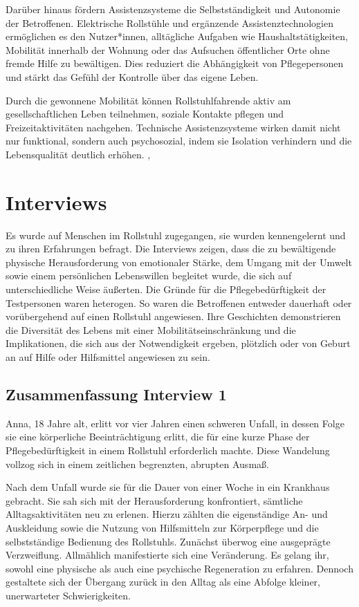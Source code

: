 Darüber hinaus fördern Assistenzsysteme die Selbstständigkeit und Autonomie der Betroffenen. Elektrische Rollstühle und ergänzende Assistenztechnologien ermöglichen es den Nutzer*innen, alltägliche Aufgaben wie Haushaltstätigkeiten, Mobilität innerhalb der Wohnung oder das Aufsuchen öffentlicher Orte ohne fremde Hilfe zu bewältigen. Dies reduziert die Abhängigkeit von Pflegepersonen und stärkt das Gefühl der Kontrolle über das eigene Leben.
\cite{StephanieSackl2021}

Durch die gewonnene Mobilität können Rollstuhlfahrende aktiv am gesellschaftlichen Leben teilnehmen, soziale Kontakte pflegen und Freizeitaktivitäten nachgehen. Technische Assistenzsysteme wirken damit nicht nur funktional, sondern auch psychosozial, indem sie Isolation verhindern und die Lebensqualität deutlich erhöhen.
\cite{StephanieSackl2021}, \cite{JuntangDarboe2022}


\section{Interviews}
Es wurde auf Menschen im Rollstuhl zugegangen, sie wurden kennengelernt und zu ihren Erfahrungen befragt. Die Interviews zeigen, dass die zu bewältigende physische Herausforderung von emotionaler Stärke, dem Umgang mit der Umwelt sowie einem persönlichen Lebenswillen begleitet wurde, die sich auf unterschiedliche Weise äußerten. Die Gründe für die Pflegebedürftigkeit der Testpersonen waren heterogen. So waren die Betroffenen entweder dauerhaft oder vorübergehend auf einen Rollstuhl angewiesen. Ihre Geschichten demonstrieren die Diversität des Lebens mit einer Mobilitätseinschränkung und die Implikationen, die sich aus der Notwendigkeit ergeben, plötzlich oder von Geburt an auf Hilfe oder Hilfsmittel angewiesen zu sein.

\subsection{Zusammenfassung Interview 1}
Anna, 18 Jahre alt, erlitt vor vier Jahren einen schweren Unfall, in dessen Folge sie eine 
körperliche Beeinträchtigung erlitt, die für eine kurze Phase der Pflegebedürftigkeit in einem Rollstuhl erforderlich machte. Diese Wandelung vollzog sich in einem zeitlichen begrenzten, abrupten Ausmaß.

Nach dem Unfall wurde sie für die Dauer von einer Woche in ein Krankhaus gebracht. Sie sah sich 
mit der Herausforderung konfrontiert, sämtliche Alltagsaktivitäten neu zu erlenen. Hierzu zählten 
die eigenständige An- und Auskleidung sowie die Nutzung von Hilfsmitteln zur Körperpflege und die 
selbstständige Bedienung des Rollstuhls. Zunächst überwog eine ausgeprägte Verzweiflung. Allmählich manifestierte sich eine Veränderung. Es gelang ihr, sowohl eine physische als auch eine psychische Regeneration zu erfahren. Dennoch gestaltete sich der Übergang zurück in den 
Alltag als eine Abfolge kleiner, unerwarteter Schwierigkeiten. 

